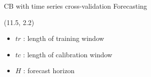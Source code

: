 \documentclass[
  12pt,
  ignorenonframetext,
  aspectratio=169,
]{beamer}
\begin{document}
\begin{frame}{CB with time series cross-validation Forecasting}
\label{cb-with-time-series-cross-validation-forecasting}

\begin{textblock}{4}(11.5, 2.2)
\fontsize{11}{12}\sf
\begin{block}{}
  \begin{itemize}
  \item \color{violet} {$tr$} : \color{black} length of training window \newline
  \item \color{violet} {$tc$} : \color{black} length of calibration window \newline
  \item \color{violet} {$H$} : \color{black} forecast horizon \newline
\end{itemize}
\end{block}
\end{textblock}
\end{frame}
\end{document}
